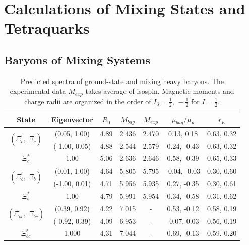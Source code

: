 \documentclass[prd,twocolumn,floatfix,nofootinbib]{revtex4}
\begin{document}
\section{Calculations of Mixing States and Tetraquarks}\label{Hadrons}
\subsection{Baryons of Mixing Systems}
\renewcommand{\tabcolsep}{0.73cm}
\renewcommand{\arraystretch}{1.3}
\begin{table}[!htbp]
    \caption{Predicted spectra of ground-state and mixing heavy baryons. The experimental data $M_{exp}$ takes average of isospin.
    Magnetic moments and charge radii are organized in the order of $I_{3}=\frac{1}{2},\,-\frac{1}{2}$ for $I=\frac{1}{2}$.}
    \label{tab:mixingbaryon}
    \begin{tabular}{ccccccc}
        \hline\hline
        {\rm State}         &{\rm Eigenvector}  &$R_{0}$    &$M_{bag}$  &$M_{exp}$  &$\mu_{bag}/\mu_{p}$    &$r_{E}$ \\ \hline
        \multirow{2}{*}{$\left(\Xi_{c}^{\prime},\ \Xi_{c}\right)$}
                            &(0.05, 1.00)       &4.89	    &2.436	    &2.470      &0.13, 0.18             &0.63, 0.32 \\ 
                            &(-1.00, 0.05)      &4.88	    &2.544	    &2.579      &0.24, -0.43            &0.63, 0.32 \\ 
        $\Xi_{c}^{\ast}$ 	&1.00               &5.06	    &2.636	    &2.646      &0.58, -0.39            &0.65, 0.33 \\ 
        \multirow{2}{*}{$\left(\Xi_{b}^{\prime},\ \Xi_{b}\right)$}
                            &(0.01, 1.00)       &4.64	    &5.805	    &5.795      &-0.04, -0.03           &0.30, 0.60 \\ 
                            &(-1.00, 0.01)      &4.71	    &5.956	    &5.935      &0.27, -0.35            &0.30, 0.61 \\ 
        $\Xi_{b}^{\ast}$ 	&1.00               &4.79	    &5.991	    &5.954      &0.34, -0.58            &0.31, 0.62 \\ 
        \multirow{2}{*}{$\left(\Xi_{bc}^{\prime},\ \Xi_{bc}\right)$}
                            &(0.39, 0.92)       &4.22	    &7.015	    &-          &0.53, -0.12            &0.58, 0.19 \\ 
                            &(-0.92, 0.39)      &4.09	    &6.953	    &-          &-0.07, 0.03            &0.56, 0.19 \\ 
        $\Xi_{bc}^{\ast}$ 	&1.000              &4.31	    &7.044	    &-          &0.69, -0.13            &0.59, 0.20 \\ 

\end{tabular}
\end{table}
\end{document}
